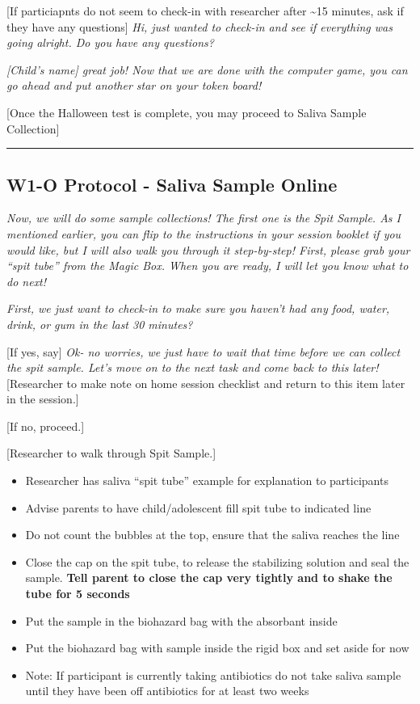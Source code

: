 \documentclass[
]{book}
\providecommand{\tightlist}{%
  \setlength{\itemsep}{0pt}\setlength{\parskip}{0pt}}
\begin{document}
{[}If particiapnts do not seem to check-in with researcher after \textasciitilde15 minutes, ask if they have any questions{]} \emph{Hi, just wanted to check-in and see if everything was going alright. Do you have any questions?}

\emph{{[}Child's name{]} great job! Now that we are done with the computer game, you can go ahead and put another star on your token board!}

{[}Once the Halloween test is complete, you may proceed to Saliva Sample Collection{]}

\begin{center}\rule{0.5\linewidth}{0.5pt}\end{center}

\hypertarget{w1-o-protocol---saliva-sample-online}{%
\subsection{W1-O Protocol - Saliva Sample Online}\label{w1-o-protocol---saliva-sample-online}}

\emph{Now, we will do some sample collections! The first one is the Spit Sample. As I mentioned earlier, you can flip to the instructions in your session booklet if you would like, but I will also walk you through it step-by-step! First, please grab your ``spit tube'' from the Magic Box. When you are ready, I will let you know what to do next!}

\emph{First, we just want to check-in to make sure you haven't had any food, water, drink, or gum in the last 30 minutes?}

{[}If yes, say{]} \emph{Ok- no worries, we just have to wait that time before we can collect the spit sample. Let's move on to the next task and come back to this later!} {[}Researcher to make note on home session checklist and return to this item later in the session.{]}

{[}If no, proceed.{]}

{[}Researcher to walk through Spit Sample.{]}

\begin{itemize}
\tightlist
\item
  Researcher has saliva ``spit tube'' example for explanation to participants
\item
  Advise parents to have child/adolescent fill spit tube to indicated line
\item
  Do not count the bubbles at the top, ensure that the saliva reaches the line
\item
  Close the cap on the spit tube, to release the stabilizing solution and seal the sample.
  \textbf{Tell parent to close the cap very tightly and to shake the tube for 5 seconds}
\item
  Put the sample in the biohazard bag with the absorbant inside
\item
  Put the biohazard bag with sample inside the rigid box and set aside for now
\item
  Note: If participant is currently taking antibiotics do not take saliva sample until they have been off antibiotics for at least two weeks
\end{itemize}
\end{document}
